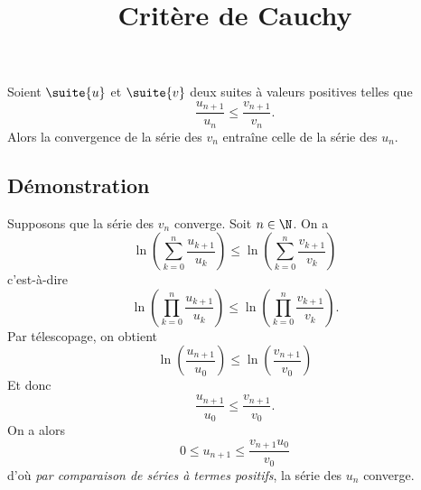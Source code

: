 \documentclass[fontsize=12pt,twoside=false,parskip=half]{scrartcl}
\title{Critère de Cauchy}
\date{}
\author{}
\begin{document}
\maketitle
   \begin{Theoreme}
      Soient $\suite{u}$ et $\suite{v}$ deux suites à valeurs positives telles que 
      \[
         \frac{u_{n + 1}}{u_n} \leq \frac{v_{n + 1}}{v_n}.
      \]
      Alors la convergence de la série des $v_n$ entraîne celle de la série des $u_n$.
   \end{Theoreme}
   \subsection{Démonstration}
      Supposons que la série des $v_n$ converge. Soit $n \in \N$. On a
      \[
         \ln \left( \sum_{k = 0}^n \frac{u_{k + 1}}{u_k} \right) \leq \ln \left( \sum_{k = 0}^n \frac{v_{k + 1}}{v_k} \right)
      \]
      c’est-à-dire
      \[
        \ln \left(\prod_{k = 0}^n \frac{u_{k + 1}}{u_k} \right) \leq \ln \left(\prod_{k = 0}^n\frac{v_{k + 1}}{v_k} \right).
      \]
      Par télescopage, on obtient
      \[
         \ln\left(\frac{u_{n + 1}}{u_0}\right) \leq \ln\left(\frac{v_{n + 1}}{v_0}\right)
      \]
      Et donc 
      \[
         \frac{u_{n + 1}}{u_0} \leq \frac{v_{n + 1}}{v_0}.
      \]
      On a alors
      \[
         0 \leq u_{n + 1} \leq \frac{v_{n + 1} u_0}{v_0}
      \]
      d’où \emph{par comparaison de séries à termes positifs}, la série des $u_n$ converge.
\end{document}
